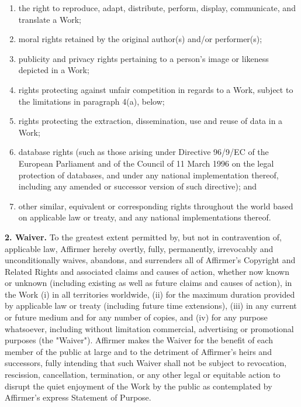 \begin{enumerate}
\item the right to reproduce, adapt, distribute, perform,
display, communicate, and translate a Work;
\item  moral rights retained by the original author(s) and/or
performer(s);
\item publicity and privacy rights pertaining to a person's
image or likeness depicted in a Work;
\item rights protecting against unfair competition in regards
to a Work, subject to the limitations in paragraph 4(a),
below;
\item rights protecting the extraction, dissemination, use and
reuse of data in a Work;
\item database rights (such as those arising under Directive
96/9/EC of the European Parliament and of the Council of 11
March 1996 on the legal protection of databases, and under
any national implementation thereof, including any amended
or successor version of such directive); and
\item other similar, equivalent or corresponding rights
throughout the world based on applicable law or treaty, and
any national implementations thereof.
\end{enumerate}
\par \textbf{2. Waiver.} To the greatest extent
permitted by, but not in contravention of, applicable law,
Affirmer hereby overtly, fully, permanently, irrevocably and
unconditionally waives, abandons, and surrenders all of
Affirmer's Copyright and Related Rights and associated claims
and causes of action, whether now known or unknown (including
existing as well as future claims and causes of action), in
the Work (i) in all territories worldwide, (ii) for the
maximum duration provided by applicable law or treaty
(including future time extensions), (iii) in any current or
future medium and for any number of copies, and (iv) for any
purpose whatsoever, including without limitation commercial,
advertising or promotional purposes (the "Waiver"). Affirmer
makes the Waiver for the benefit of each member of the public
at large and to the detriment of Affirmer's heirs and
successors, fully intending that such Waiver shall not be
subject to revocation, rescission, cancellation, termination,
or any other legal or equitable action to disrupt the quiet
enjoyment of the Work by the public as contemplated by
Affirmer's express Statement of Purpose.

